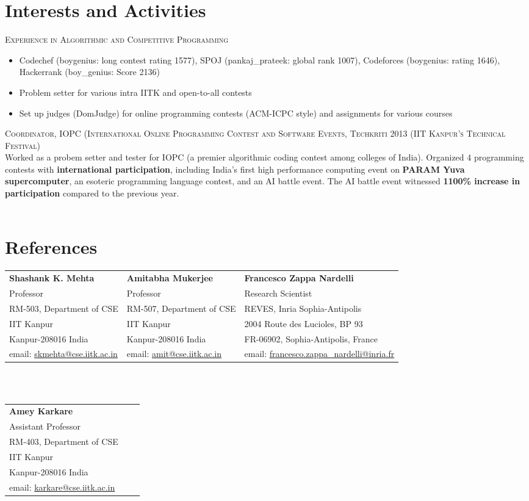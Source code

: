 \documentclass[a4paper,10pt]{article}
\begin{document}
\section{Interests and Activities}
\textsc{Experience in Algorithmic and Competitive Programming}
\begin{itemize}
\item \small{Codechef (boygenius: long contest rating 1577), SPOJ (pankaj\_prateek: global rank 1007), Codeforces (boygenius: rating 1646), Hackerrank (boy\_genius: Score 2136)}
\item \small{Problem setter for various intra IITK and open-to-all contests}
\item \small{Set up judges (DomJudge) for online programming contests (ACM-ICPC style) and assignments for various courses}
\end{itemize}
\textsc{Coordinator, IOPC (International Online Programming Contest and Software Events, Techkriti 2013 (IIT Kanpur's Technical Festival)}\\
{\small Worked as a probem setter and tester for IOPC (a premier algorithmic coding contest among colleges of India). Organized 4 programming contests with \textbf{international participation}, including India's first high performance computing event on \textbf{PARAM Yuva supercomputer}, an esoteric programming language contest, and an AI battle event. The AI battle event witnessed \textbf{1100\% increase in participation} compared to the previous year.}\\\\

\section{References}
\begin{tabular}{p{5cm}|p{5cm}|p{6cm}}
\textbf{Shashank K. Mehta} & \textbf{Amitabha Mukerjee} & \textbf{Francesco Zappa Nardelli}\\
{\small Professor} & {\small Professor} & {\small Research Scientist}\\
{\small RM-503, Department of CSE} & {\small RM-507, Department of CSE} & {\small REVES, Inria Sophia-Antipolis}\\
{\small IIT Kanpur} & {\small IIT Kanpur} & {\small 2004 Route des Lucioles, BP 93}\\
{\small Kanpur-208016 India} & {\small Kanpur-208016 India} & {\small FR-06902, Sophia-Antipolis, France}\\
{\small email: \href{mailto:skmehta@cse.iitk.ac.in}{skmehta@cse.iitk.ac.in}} &
{\small email: \href{mailto:amit@cse.iitk.ac.in}{amit@cse.iitk.ac.in}} &
{\small email: \href{mailto:francesco.zappa_nardelli@inria.fr}{francesco.zappa\_nardelli@inria.fr}}
\end{tabular}\\\\


\begin{tabular}{p{5cm}p{5cm}p{6cm}}
\textbf{Amey Karkare} & &\\
{\small Assistant Professor} & &\\
{\small RM-403, Department of CSE} & &\\
{\small IIT Kanpur} & &\\
{\small Kanpur-208016 India} & &\\
{\small email: \href{mailto:karkare@cse.iitk.ac.in}{karkare@cse.iitk.ac.in}} & & \\
\end{tabular}
\end{document}
